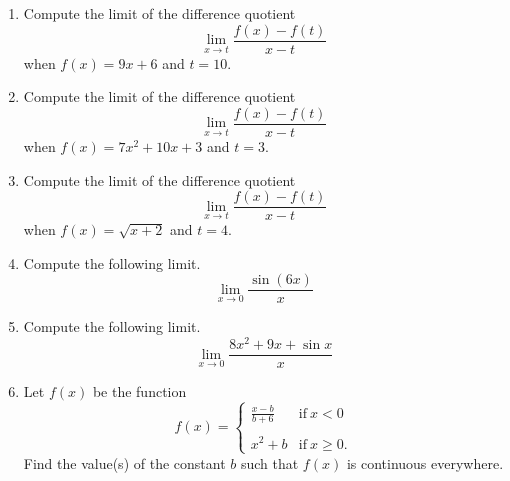\documentclass{article}
\begin{document}
\ActivityTitle[class=Calculus I, number=2, name=Continuity]

\begin{enumerate}
\item Compute the limit of the difference quotient \[ \lim_{x \rightarrow t} \frac{f(x) - f(t)}{x - t} \] when $f(x) = 9 x + 6$ and $t = 10$.



  
\vspace{5cm}

\item Compute the limit of the difference quotient \[ \lim_{x \rightarrow t} \frac{f(x) - f(t)}{x - t} \] when $f(x) = 7 x^2 + 10 x + 3$ and $t = 3$.



  
\vspace{5cm}

\item Compute the limit of the difference quotient \[ \lim_{x \rightarrow t} \frac{f(x) - f(t)}{x - t} \] when $f(x) = \sqrt{x + 2}$ and $t = 4$.



  
\vspace{5cm}

\item Compute the following limit. \[ \lim_{x \rightarrow 0} \frac{\sin(6 x)}{x} \]



  
\vspace{5cm}

\item Compute the following limit. \[ \lim_{x \rightarrow 0} \frac{8 x^2 + 9 x + \sin x}{x} \]



  
\vspace{5cm}

\item Let $f(x)$ be the function \[ f(x) = \left\{ \begin{array}{ll} \frac{x-b}{b + 6} & \mathrm{if}\ x < 0 \\ & \\ x^2 + b & \mathrm{if}\ x \geq 0. \end{array}\right. \] Find the value(s) of the constant $b$ such that $f(x)$ is continuous everywhere.



  
\vspace{5cm}
\end{enumerate}
\end{document}

